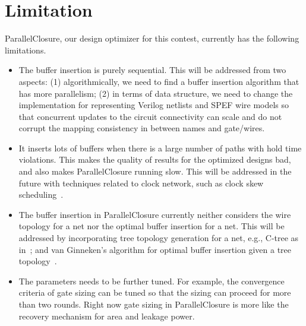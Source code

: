 \section{Limitation}
\label{sec:limit}

ParallelClosure, our design optimizer for this contest, currently has the following limitations.

\begin{itemize}
\item The buffer insertion is purely sequential. This will be addressed from two aspects: (1) algorithmically, we need to find a buffer insertion algorithm that has more parallelism; (2) in terms of data structure, we need to change the implementation for representing Verilog netlists and SPEF wire models so that concurrent updates to the circuit connectivity can scale and do not corrupt the mapping consistency in between names and gate/wires.
\item It inserts lots of buffers when there is a large number of paths with hold time violations. This makes the quality of results for the optimized designs bad, and also makes ParallelClosure running slow. This will be addressed in the future with techniques related to clock network, such as clock skew scheduling~\cite{Friedman:Clock}.
\item The buffer insertion in ParallelClosure currently neither considers the wire topology for a net nor the optimal buffer insertion for a net. This will be addressed by incorporating tree topology generation for a net, e.g., C-tree as in~\cite{Alpert:Buffered}; and van Ginneken's algorithm for optimal buffer insertion given a tree topology~\cite{Lukas:Buffer}. 
\item The parameters needs to be further tuned. For example, the convergence criteria of gate sizing can be tuned so that the sizing can proceed for more than two rounds. Right now gate sizing in ParallelClosure is more like the recovery mechanism for area and leakage power.
\end{itemize}
